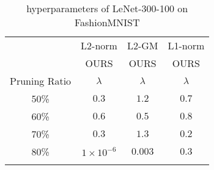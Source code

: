 \begin{table*}[h]
\centering 
\scriptsize
\begin{tabular}{c|c|c|c}\Xhline{2\arrayrulewidth}
\multirow{2}{*}{Criterion} & L2-norm& L2-GM & L1-norm\\ \cline{2-4} 
& OURS& OURS& OURS\\ \hline
Pruning Ratio& $\lambda$  & $\lambda$    & $\lambda$ \\\Xhline{2\arrayrulewidth}
50\%  & $0.3$  & $1.2$ & $0.7$  \\ \hline
60\%  & $0.6$  & $0.5$ & $0.8$  \\ \hline
70\%  & $0.3$  & $1.3$ & $0.2$   \\ \hline
80\%  & $1\times10^{-6}$  & $0.003$ & $0.3$  \\ \hline\Xhline{2\arrayrulewidth}
\end{tabular}%
\caption{hyperparameters of LeNet-300-100 on FashionMNIST}
\label{tab:param:LeNet:fashionmnist}
\vspace{4mm}
\end{table*}


